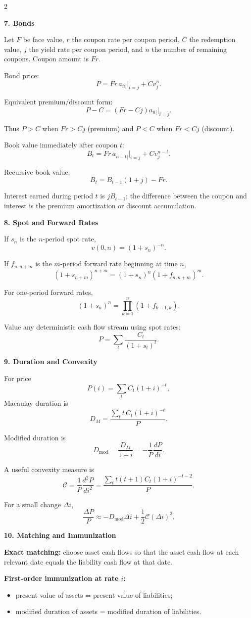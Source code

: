 \documentclass[10pt]{article}
\newcommand{\sect}[1]{%
  \vspace{4pt}%
  \noindent\colorbox{softgreen}{\parbox{\dimexpr\linewidth-2\fboxsep\relax}{\color{deepgreen}\bfseries #1}}%
  \vspace{3pt}%
}
\newcommand{\ann}[1]{a_{\overline{#1}|}}
\begin{document}
\begin{multicols}{2}
\sect{7. Bonds}

Let $F$ be face value, $r$ the coupon rate per coupon period, $C$ the redemption value, $j$ the yield rate per coupon period, and $n$ the number of remaining coupons. Coupon amount is $Fr$.

Bond price:
\[ P=Fr\,\ann{n}\big|_{i=j}+Cv_j^n. \]

Equivalent premium/discount form:
\[ P-C=(Fr-Cj)\ann{n}\big|_{i=j}. \]

Thus $P>C$ when $Fr>Cj$ (premium) and $P<C$ when $Fr<Cj$ (discount).

Book value immediately after coupon $t$:
\[ B_t=Fr\,\ann{n-t}\big|_{i=j}+Cv_j^{n-t}. \]

Recursive book value:
\[ B_t=B_{t-1}(1+j)-Fr. \]

Interest earned during period $t$ is $jB_{t-1}$; the difference between the coupon and interest is the premium amortization or discount accumulation.

\sect{8. Spot and Forward Rates}

If $s_n$ is the $n$-period spot rate,
\[ v(0,n)=(1+s_n)^{-n}. \]

If $f_{n,n+m}$ is the $m$-period forward rate beginning at time $n$,
\[ (1+s_{n+m})^{n+m}=(1+s_n)^n(1+f_{n,n+m})^m. \]

For one-period forward rates,
\[ (1+s_n)^n=\prod_{k=1}^{n}(1+f_{k-1,k}). \]

Value any deterministic cash flow stream using spot rates:
\[ P=\sum_{t} \frac{C_t}{(1+s_t)^t}. \]

\sect{9. Duration and Convexity}

For price
\[ P(i)=\sum_t C_t(1+i)^{-t}, \]
Macaulay duration is
\[ D_M=\frac{\sum_t t\,C_t(1+i)^{-t}}{P}. \]

Modified duration is
\[ D_{\mathrm{mod}}=\frac{D_M}{1+i}=-\frac{1}{P}\frac{dP}{di}. \]

A useful convexity measure is
\[ \mathcal C=\frac{1}{P}\frac{d^2P}{di^2}=\frac{\sum_t t(t+1)C_t(1+i)^{-t-2}}{P}. \]

For a small change $\Delta i$,
\[ \frac{\Delta P}{P}\approx -D_{\mathrm{mod}}\Delta i+\frac12\mathcal C(\Delta i)^2. \]

\sect{10. Matching and Immunization}

\textbf{Exact matching:} choose asset cash flows so that the asset cash flow at each relevant date equals the liability cash flow at that date.

\textbf{First-order immunization at rate $i$:}
\begin{itemize}
\item present value of assets = present value of liabilities;
\item modified duration of assets = modified duration of liabilities.
\end{itemize}


\end{multicols}
\end{document}
